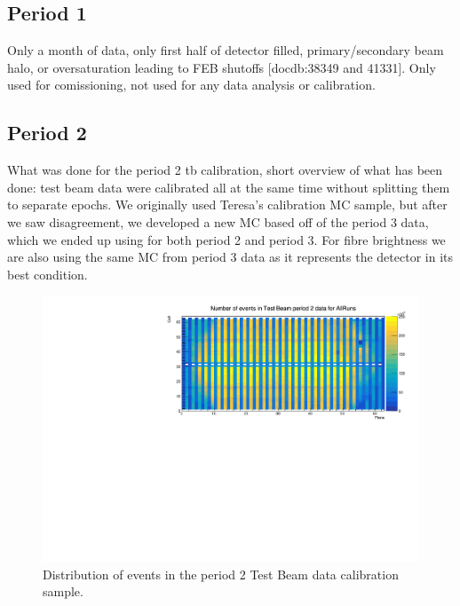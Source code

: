 \documentclass[12pt,a4paper]{article}
\begin{document}
\subsection{Period 1}
Only a month of data, only first half of detector filled, primary/secondary beam halo, or oversaturation leading to FEB shutoffs [docdb:38349 and 41331].
Only used for comissioning, not used for any data analysis or calibration.

\subsection{Period 2}
What was done for the period 2 tb calibration, short overview of what has been done: test beam data were calibrated all at the same time without splitting them to separate epochs. We originally used Teresa's calibration MC sample, but after we saw disagreement, we developed a new MC based off of the period 3 data, which we ended up using for both period 2 and period 3. For fibre brightness we are also using the same MC from period 3 data as it represents the detector in its best condition.

\begin{figure}[hbtp]
\centering
\includegraphics[width=\textwidth]{Plots/Attenprofs_P2Data_CellPlane_AllRuns.pdf}
\caption{Distribution of events in the period 2 Test Beam data calibration sample.}
\end{figure}
\end{document}
